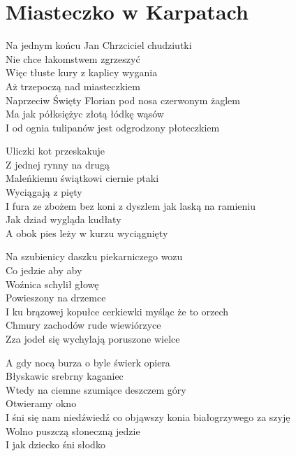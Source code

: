 \section{Miasteczko w Karpatach}
\begin{text}
Na jednym końcu Jan Chrzciciel chudziutki\\
Nie chce łakomstwem zgrzeszyć\\
Więc tłuste kury z kaplicy wygania\\
Aż trzepoczą nad miasteczkiem\\
Naprzeciw Święty Florian pod nosa czerwonym żaglem\\
Ma jak półksiężyc złotą łódkę wąsów\\
I od ognia tulipanów jest odgrodzony płoteczkiem

Uliczki kot przeskakuje\\
Z jednej rynny na drugą\\
Maleńkiemu świątkowi ciernie ptaki\\
Wyciągają z pięty\\
I fura ze zbożem bez koni z dyszlem jak laską na ramieniu\\
Jak dziad wygląda kudłaty\\
A obok pies leży w kurzu wyciągnięty

Na szubienicy daszku piekarniczego wozu\\
Co jedzie aby aby\\
Woźnica schylił głowę\\
Powieszony na drzemce\\
I ku brązowej kopułce cerkiewki myśląc że to orzech\\
Chmury zachodów rude wiewiórzyce\\
Zza jodeł się wychylają poruszone wielce

A gdy nocą burza o byle świerk opiera\\
Błyskawic srebrny kaganiec\\
Wtedy na ciemne szumiące deszczem góry\\
Otwieramy okno\\
I śni się nam niedźwiedź co objąwszy konia białogrzywego za szyję\\
Wolno puszczą słoneczną jedzie\\
I jak dziecko śni słodko
\end{text}
